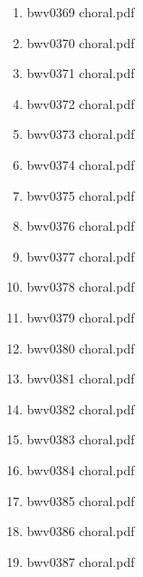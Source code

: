 \documentclass[11pt]{article}
\begin{document}
\begin{enumerate}
\begin{enumerate}
\begin{enumerate}
\begin{enumerate}
\item bwv0369 choral.pdf
\label{sec-1-1-1-1-44-6-7-2-4-118}

\item bwv0370 choral.pdf
\label{sec-1-1-1-1-44-6-7-2-4-119}

\item bwv0371 choral.pdf
\label{sec-1-1-1-1-44-6-7-2-4-120}

\item bwv0372 choral.pdf
\label{sec-1-1-1-1-44-6-7-2-4-121}

\item bwv0373 choral.pdf
\label{sec-1-1-1-1-44-6-7-2-4-122}

\item bwv0374 choral.pdf
\label{sec-1-1-1-1-44-6-7-2-4-123}

\item bwv0375 choral.pdf
\label{sec-1-1-1-1-44-6-7-2-4-124}

\item bwv0376 choral.pdf
\label{sec-1-1-1-1-44-6-7-2-4-125}

\item bwv0377 choral.pdf
\label{sec-1-1-1-1-44-6-7-2-4-126}

\item bwv0378 choral.pdf
\label{sec-1-1-1-1-44-6-7-2-4-127}

\item bwv0379 choral.pdf
\label{sec-1-1-1-1-44-6-7-2-4-128}

\item bwv0380 choral.pdf
\label{sec-1-1-1-1-44-6-7-2-4-129}

\item bwv0381 choral.pdf
\label{sec-1-1-1-1-44-6-7-2-4-130}

\item bwv0382 choral.pdf
\label{sec-1-1-1-1-44-6-7-2-4-131}

\item bwv0383 choral.pdf
\label{sec-1-1-1-1-44-6-7-2-4-132}

\item bwv0384 choral.pdf
\label{sec-1-1-1-1-44-6-7-2-4-133}

\item bwv0385 choral.pdf
\label{sec-1-1-1-1-44-6-7-2-4-134}

\item bwv0386 choral.pdf
\label{sec-1-1-1-1-44-6-7-2-4-135}

\item bwv0387 choral.pdf
\label{sec-1-1-1-1-44-6-7-2-4-136}


\end{enumerate}
\end{enumerate}
\end{enumerate}
\end{enumerate}
\end{document}
